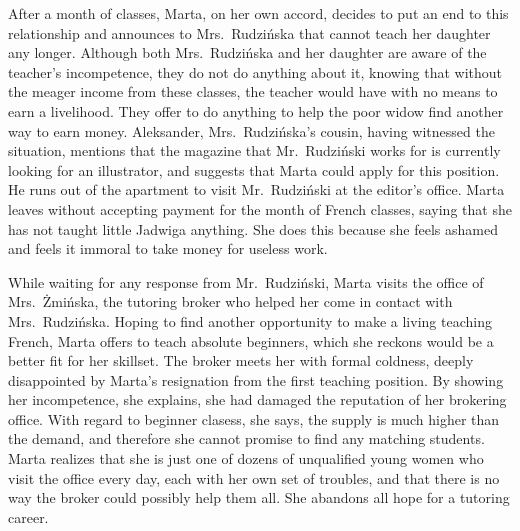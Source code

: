 After a month of classes, Marta, on her own accord, decides to put an end to this relationship and announces to Mrs.\ Rudzińska that cannot teach her daughter any longer.
Although both Mrs.\ Rudzińska and her daughter are aware of the teacher's incompetence, they do not do anything about it, knowing that without the meager income from these classes, the teacher would have with no means to earn a livelihood.
They offer to do anything to help the poor widow find another way to earn money.
Aleksander, Mrs.\ Rudzińska's cousin, having witnessed the situation, mentions that the magazine that Mr.\ Rudziński works for is currently looking for an illustrator, and suggests that Marta could apply for this position.
He runs out of the apartment to visit Mr.\ Rudziński at the editor's office.
Marta leaves without accepting payment for the month of French classes, saying that she has not taught little Jadwiga anything.
She does this because she feels ashamed and feels it immoral to take money for useless work.

While waiting for any response from Mr.\ Rudziński, Marta visits the office of Mrs.\ Żmińska, the tutoring broker who helped her come in contact with Mrs.\ Rudzińska.
Hoping to find another opportunity to make a living teaching French, Marta offers to teach absolute beginners, which she reckons would be a better fit for her skillset.
The broker meets her with formal coldness, deeply disappointed by Marta's resignation from the first teaching position.
By showing her incompetence, she explains, she had damaged the reputation of her brokering office.
With regard to beginner clasess, she says, the supply is much higher than the demand, and therefore she cannot promise to find any matching students.
Marta realizes that she is just one of dozens of unqualified young women who visit the office every day, each with her own set of troubles, and that there is no way the broker could possibly help them all.
She abandons all hope for a tutoring career.
